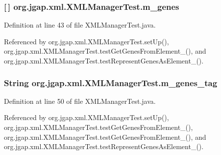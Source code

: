 \hypertarget{classorg_1_1jgap_1_1xml_1_1_x_m_l_manager_test_af2fda23b570266a670d795ed631ecb90}{
\subsubsection[{m\-\_\-genes}]{ \mbox{[}$\,$\mbox{]} org.\-jgap.\-xml.\-X\-M\-L\-Manager\-Test.\-m\-\_\-genes\hspace{0.3cm}{\ttfamily [private]}}}\label{classorg_1_1jgap_1_1xml_1_1_x_m_l_manager_test_af2fda23b570266a670d795ed631ecb90}


Definition at line 43 of file X\-M\-L\-Manager\-Test.\-java.



Referenced by org.\-jgap.\-xml.\-X\-M\-L\-Manager\-Test.\-set\-Up(), org.\-jgap.\-xml.\-X\-M\-L\-Manager\-Test.\-test\-Get\-Genes\-From\-Element\-\_(), and org.\-jgap.\-xml.\-X\-M\-L\-Manager\-Test.\-test\-Represent\-Genes\-As\-Element\-\_().

\hypertarget{classorg_1_1jgap_1_1xml_1_1_x_m_l_manager_test_a58f74bdf7f84d0f72451af24e717da11}{
\subsubsection[{m\-\_\-genes\-\_\-tag}]{\setlength{\rightskip}{0pt plus 5cm}String org.\-jgap.\-xml.\-X\-M\-L\-Manager\-Test.\-m\-\_\-genes\-\_\-tag\hspace{0.3cm}{\ttfamily [private]}}}\label{classorg_1_1jgap_1_1xml_1_1_x_m_l_manager_test_a58f74bdf7f84d0f72451af24e717da11}


Definition at line 50 of file X\-M\-L\-Manager\-Test.\-java.



Referenced by org.\-jgap.\-xml.\-X\-M\-L\-Manager\-Test.\-set\-Up(), org.\-jgap.\-xml.\-X\-M\-L\-Manager\-Test.\-test\-Get\-Genes\-From\-Element\-\_(), org.\-jgap.\-xml.\-X\-M\-L\-Manager\-Test.\-test\-Get\-Genes\-From\-Element\-\_(), and org.\-jgap.\-xml.\-X\-M\-L\-Manager\-Test.\-test\-Represent\-Genes\-As\-Element\-\_().

